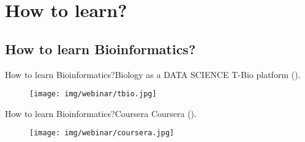 \documentclass[10pt]{beamer}
\newcommand{\1}{
        	\setbeamertemplate{background}{
        		\texttt{[image: img/1]}
        		\tikz[overlay] \fill[fill opacity=0.75,fill=white] (0,0) rectangle (-\paperwidth,\paperheight);
        	}
}
\begin{document}
\section{How to learn?}

\subsection{How to learn Bioinformatics?}

\begin{frame}{How to learn Bioinformatics?}{Biology as a DATA SCIENCE}
	T-Bio platform (\href{https://edu.t-bio.info/}{}).
	\begin{figure}[]
		\centering
		\texttt{[image: img/webinar/tbio.jpg]}				
	\end{figure}	
\end{frame}

\begin{frame}{How to learn Bioinformatics?}{Coursera}
	Coursera (\href{https://www.coursera.org/}{}).
	\begin{figure}[]
		\centering
		\texttt{[image: img/webinar/coursera.jpg]}				
	\end{figure}	
\end{frame}
\end{document}
